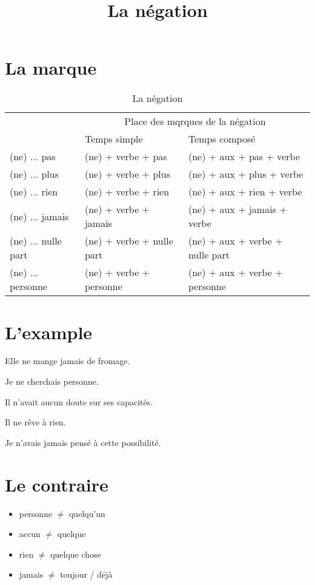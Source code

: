\documentclass{article}
\begin{document}
\title{La négation}
\date{}
\begin{titlepage}
  \maketitle{}
  \tableofcontents{}
\end{titlepage}

\section{La marque}


\begin{table}[H]
  \centering
  \begin{tabular}[H]{p{}||p{}|p{}}
    \hline{}
    \multirow{2}{8em}{Marque de la négation} & \multicolumn{2}{c}{Place des mqrques de la négation} \\
    \cline{2-3}
                                             & Temps simple & Temps composé \\
    \hline
    (ne) ... pas & (ne) + verbe + pas & (ne) + aux + pas + verbe \\
    (ne) ... plus & (ne) + verbe + plus & (ne) + aux + plus + verbe \\
    (ne) ... rien & (ne) + verbe + rien & (ne) + aux + rien + verbe \\
    (ne) ... jamais & (ne) + verbe + jamais & (ne) + aux + jamais + verbe \\
    (ne) ... nulle part & (ne) + verbe + nulle part & (ne) + aux + verbe + {\color{red}nulle part} \\
    (ne) ... personne & (ne) + verbe + personne & (ne) + aux + verbe + {\color{red}personne}\\
    \hline
    
  \end{tabular}
  
  \caption{La négation}
\end{table}

\section{L'example}


Elle ne mange jamais de fromage.

Je ne cherchais personne.

Il n'avait aucun doute sur ses capacités.

Il ne rêve à rien.

Je n'avais jamais pensé à cette possibilité.

\section{Le contraire}


\begin{itemize}
\item personne $\ne$ quelqu'un
\item accun $\ne$ quelque
\item rien $\ne$ quelque chose
\item jamais $\ne$ toujour / déjà

\end{itemize}
\end{document}
